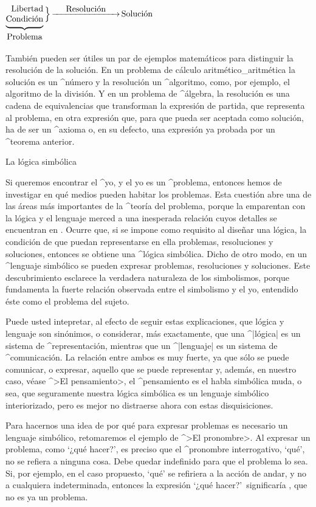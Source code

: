 \bigskip
\centerline{$\underbrace{\vcenter{
  \halign{\strut\hfil\rm#\crcr Libertad\cr Condición\cr}}
    }_{\hbox{\rm\strut Problema}} \, \Bigr\rbrace
 \mathop{\hbox to 80pt{\rightarrowfill}}\limits^{\hbox{\rm Resolución}}
 \hbox{\rm Solución}$}
\bigskip

También pueden ser útiles un par de ejemplos matemáticos para distinguir
la resolución de la solución. En un problema de cálculo
aritmético_{aritmética} la solución es un ^{número} y la resolución un
^{algoritmo}, como, por ejemplo, el algoritmo de la división. Y en un
problema de ^{álgebra}, la resolución es una cadena de equivalencias que
transforman la expresión de partida, que representa al problema, en otra
expresión que, para que pueda ser aceptada como solución, ha de ser un
^{axioma} o, en su defecto, una expresión ya probada por un ^{teorema}
anterior.


\Section La lógica simbólica

Si queremos encontrar el ^{yo}, y el yo es un ^{problema}, entonces
hemos de investigar en qué medios pueden habitar los problemas. Esta
cuestión abre una de las áreas más importantes de la ^{teoría del
problema}, porque la emparentan con la lógica y el lenguaje merced a una
inesperada relación cuyos detalles se encuentran en . Ocurre que,
si se impone como requisito al diseñar una lógica, la condición de que
puedan representarse en ella problemas, resoluciones y soluciones,
entonces se obtiene una ^{lógica simbólica}. Dicho de otro modo, en un
^{lenguaje simbólico} se pueden expresar problemas, resoluciones y
soluciones. Este descubrimiento esclarece la verdadera naturaleza de los
simbolismos, porque fundamenta la fuerte relación observada entre el
simbolismo y el yo, entendido éste como el problema del sujeto.

Puede usted intepretar, al efecto de seguir estas explicaciones, que
lógica y lenguaje son sinónimos, o considerar, más exactamente, que una
^|lógica| es un sistema de ^{representación}, mientras que un
^|lenguaje| es un sistema de ^{comunicación}. La relación entre ambos es
muy fuerte, ya que sólo se puede comunicar, o expresar, aquello que se
puede representar y, además, en nuestro caso, véase ^>El pensamiento>,
el ^{pensamiento} es el habla simbólica muda, o sea, que seguramente
nuestra lógica simbólica es un lenguaje simbólico interiorizado, pero es
mejor no distraerse ahora con estas disquisiciones.


Para hacernos una idea de por qué para expresar problemas es necesario
un lenguaje simbólico, retomaremos el ejemplo de ^>El pronombre>. Al
expresar un problema, como `¿qué hacer?', es preciso que el ^{pronombre}
interrogativo, `qué', no se refiera a ninguna cosa. Debe quedar
indefinido para que el problema lo sea. Si, por ejemplo, en el caso
propuesto, `qué' se refiriera a la acción de andar, y no a cualquiera
indeterminada, entonces la expresión `¿qué hacer?'\ significaría
, que no es ya un problema.

